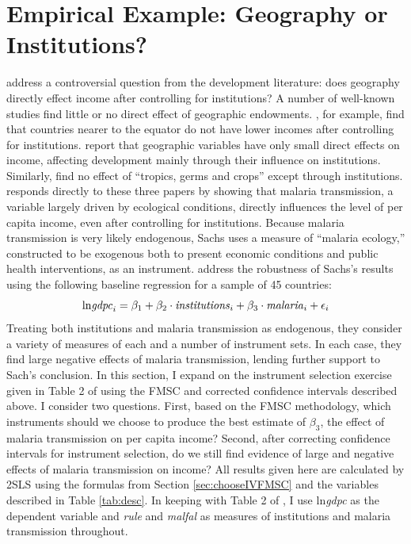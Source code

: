 \documentclass[12pt]{article}
\theoremstyle{definition}
\begin{document}
\section{Empirical Example: Geography or Institutions?}
\label{sec:application}
\cite{Carstensen2006} address a controversial question from the development literature: does geography directly effect income after controlling for institutions? A number of well-known studies find little or no direct effect of geographic endowments. \cite{Acemoglu}, for example, find that countries nearer to the equator do not have lower incomes after controlling for institutions. \cite{Rodrik} report that geographic variables have only small direct effects on income, affecting development mainly through their influence on institutions. Similarly, \cite{Easterly} find no effect of ``tropics, germs and crops'' except through institutions. \cite{Sachs} responds directly to these three papers by showing that malaria transmission, a variable largely driven by ecological conditions, directly influences the level of per capita income, even after controlling for institutions. Because malaria transmission  is very likely endogenous, Sachs uses a measure of ``malaria ecology,'' constructed to be exogenous both to present economic conditions and public health interventions, as an instrument. \cite{Carstensen2006} address the robustness of Sachs's results using the following baseline regression for a sample of 45 countries:
\begin{equation}
	\mbox{ln\emph{gdpc}}_i = \beta_1 + \beta_2 \cdot \mbox{\emph{institutions}}_i + \beta_3 \cdot \mbox{\emph{malaria}}_i + \epsilon_i
\end{equation}
Treating both institutions and malaria transmission as endogenous, they consider a variety of measures of each and a number of instrument sets. In each case, they find large negative effects of malaria transmission, lending further support to Sach's conclusion. In this section, I expand on the instrument selection exercise given in Table 2 of \cite{Carstensen2006} using the FMSC and corrected confidence intervals described above. I consider two questions. First, based on the FMSC methodology, which instruments should we choose to produce the best estimate of $\beta_3$, the effect of malaria transmission on per capita income? Second, after correcting confidence intervals for instrument selection, do we still find evidence of large and negative effects of malaria transmission on income? All results given here are calculated by 2SLS using the formulas from Section \ref{sec:chooseIVFMSC} and the variables described in Table \ref{tab:desc}. In keeping with Table 2 of \cite{Carstensen2006}, I use ln\emph{gdpc} as the dependent variable and \emph{rule} and \emph{malfal} as measures of institutions and malaria transmission throughout. 
\end{document}
